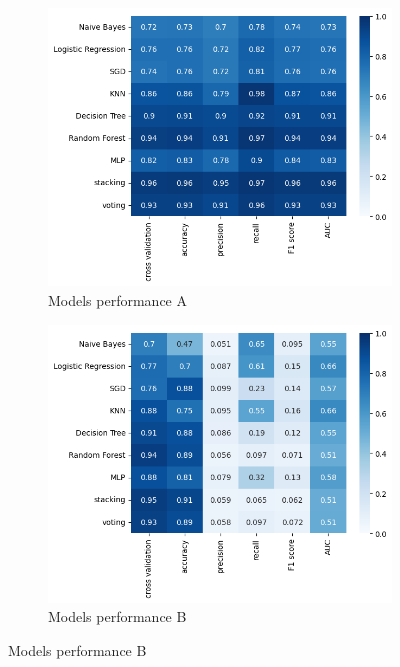 \documentclass{Configuration_Files/Template}
\begin{document}
\begin{figure}[ht]
    \centering
    \begin{subfigure}[b]{\linewidth}
        \includegraphics[scale=0.5]{Images/model_performance.png}
        \caption{Models performance A}
        \label{fig:eval_matrix_a}
    \end{subfigure}
    \begin{subfigure}[b]{\linewidth}
        \includegraphics[scale=0.5]{Images/model_performance_b.png}
        \caption{Models performance B}
        \label{fig:eval_matrix_b}
    \end{subfigure}
\end{figure}
\end{document}
